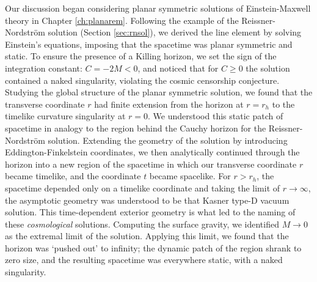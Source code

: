 Our discussion began considering planar symmetric solutions of Einstein-Maxwell theory in Chapter \ref{ch:planarem}. Following the example of the Reissner-Nordstr\"om solution (Section \ref{sec:rnsol}), we derived the line element by solving Einstein's equations, imposing that the spacetime was planar symmetric and static. To ensure the presence of a Killing horizon, we set the sign of the integration constant: $C = -2M < 0$, and noticed that for $C \geq 0$ the solution contained a naked singularity, violating the cosmic censorship conjecture. Studying the global structure of the planar symmetric solution, we found that the transverse coordinate $r$ had finite extension from the horizon at $r = r_h$ to the timelike curvature singularity at $r = 0$. We understood this static patch of spacetime in analogy to the region behind the Cauchy horizon for the Reissner-Nordstr\"om solution. Extending the geometry of the solution by introducing Eddington-Finkelstein coordinates, we then analytically continued through the horizon into a new region of the spacetime in which our transverse coordinate $r$ became timelike, and the coordinate $t$ became spacelike. For $r > r_h$, the spacetime depended only on a timelike coordinate and taking the limit of $r \rightarrow \infty$, the asymptotic geometry was understood to be that Kasner type-D vacuum solution. This time-dependent exterior geometry is what led to the naming of these \emph{cosmological} solutions. Computing the surface gravity, we identified $M \to 0$ as the extremal limit of the solution. Applying this limit, we found that the horizon was `pushed out' to infinity; the dynamic patch of the region shrank to zero size, and the resulting spacetime was everywhere static, with a naked singularity.

